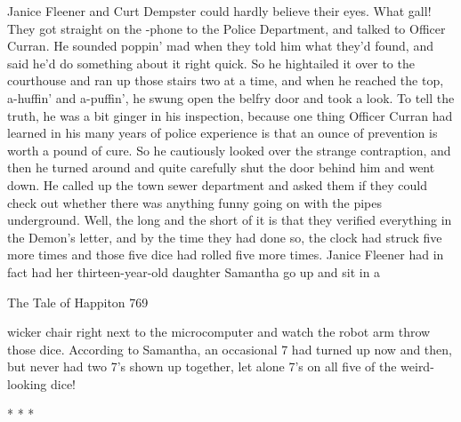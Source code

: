         Janice Fleener and Curt Dempster could hardly believe their eyes. What gall!
They got straight on the -phone to the Police Department, and talked to Officer
Curran. He sounded poppin' mad when they told him what they'd found, and said he'd
do something about it right quick. So he hightailed it over to the courthouse and ran
up those stairs two at a time, and when he reached the top, a-huffin' and a-puffin', he
swung open the belfry door and took a look. To tell the truth, he was a bit ginger in
his inspection, because one thing Officer Curran had learned in his many years of
police experience is that an ounce of prevention is worth a pound of cure. So he
cautiously looked over the strange contraption, and then he turned around and quite
carefully shut the door behind him and went down. He called up the town sewer
department and asked them if they could check out whether there was anything funny
going on with the pipes underground.
        Well, the long and the short of it is that they verified everything in the
Demon's letter, and by the time they had done so, the clock had struck five more times
and those five dice had rolled five more times. Janice Fleener had in fact had her
thirteen-year-old daughter Samantha go up and sit in a




The Tale of Happiton                                                                    769

wicker chair right next to the microcomputer and watch the robot arm throw those
dice. According to Samantha, an occasional 7 had turned up now and then, but never
had two 7's shown up together, let alone 7's on all five of the weird-looking dice!

                                       *       *      *

